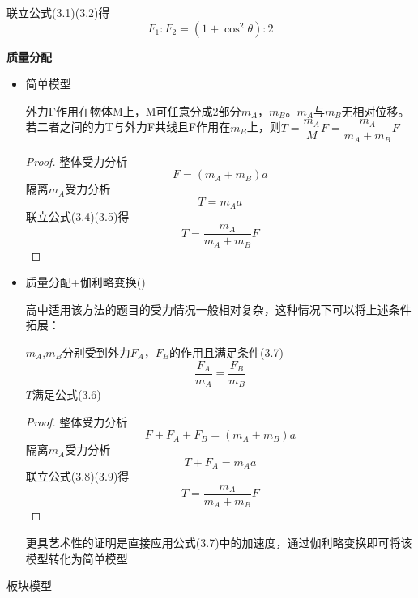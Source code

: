 \documentclass[cn,10.5pt,chinese,mac,chinesefont=founder]{elegantbook}
\begin{document}
\begin{problemset}
\begin{example}
\begin{solution}
			联立公式(3.1)(3.2)得
			\begin{equation}
				F_1:F_2=(1+\cos^2\theta):2
			\end{equation}
			
    		\end{solution}
	\end{example}
	\newpage
	\item \textbf{质量分配}
	\begin{itemize}
		\item 简单模型
		\begin{conclusion}
			外力F作用在物体M上，M可任意分成2部分$m_A$，$m_B$。$m_A$与$m_B$无相对位移。若二者之间的力T与外力F共线且F作用在$m_B$上，则$T=\dfrac{m_A}{M}F=\dfrac{m_A}{m_A+m_B}F$
		\begin{proof}
		
			整体受力分析
			\begin{equation}
				F=(m_A+m_B)a
			\end{equation}
			隔离$m_A$受力分析
			\begin{equation}
				T=m_Aa
			\end{equation}
			联立公式(3.4)(3.5)得
			\begin{equation}
				T=\dfrac{m_A}{m_A+m_B}F
			\end{equation}
		\end{proof}
		\end{conclusion}
		\item 质量分配+伽利略变换(\ding{72})
		
		高中适用该方法的题目的受力情况一般相对复杂，这种情况下可以将上述条件拓展：
		\begin{conclusion}
			$m_A$,$m_B$分别受到外力$F_A$，$F_B$的作用且满足条件(3.7)
			\begin{equation}
			\dfrac{F_A}{m_A}=\dfrac{F_B}{m_B}
			\end{equation}
			$T$满足公式(3.6)
		\end{conclusion}

		
		\begin{proof}
			整体受力分析
			\begin{equation}
				F+F_A+F_B=(m_A+m_B)a
			\end{equation}
			隔离$m_A$受力分析
			\begin{equation}
				T+F_A=m_Aa
			\end{equation}
			联立公式(3.8)(3.9)得
			\begin{equation}
				T=\dfrac{m_A}{m_A+m_B}F
			\end{equation}
		\end{proof}
		更具艺术性的证明是直接应用公式(3.7)中的加速度，通过伽利略变换即可将该模型转化为简单模型
	\end{itemize}
	\newpage
	\item 板块模型
	

\end{problemset}
\end{document}
